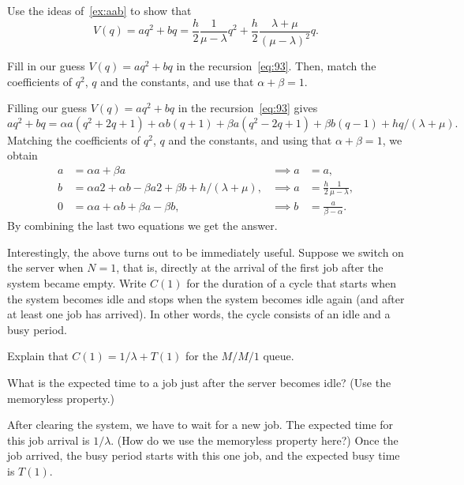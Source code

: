 \begin{exercise}\label{ex:nmm-2}
  Use the ideas of~\cref{ex:aab} to show that
  \begin{equation*}
    V(q) = a q^2 + b q = \frac h 2 \frac 1 {\mu -\lambda} q^2 + \frac h 2 \frac{\lambda + \mu}{(\mu - \lambda)^2}q.
  \end{equation*}

\begin{hint}
  Fill in our guess $V(q) = aq^2 + bq$ in the recursion~\cref{eq:93}.
  Then, match the coefficients of $q^2$, $q$ and the constants, and use that $\alpha + \beta = 1$.
\end{hint}

\begin{solution}
 Filling our guess $V(q) = aq^2 + bq$ in the recursion~\cref{eq:93}  gives
  \begin{equation*}
    aq^2 + b q = \alpha a (q^2 + 2q + 1) + \alpha b (q+1) + \beta a (q^2 - 2q + 1) + \beta b (q - 1) + hq/(\lambda + \mu). 
  \end{equation*}
  Matching the coefficients of $q^2$, $q$ and the constants, and using that $\alpha + \beta = 1$, we obtain
  \begin{align*}
    a &= \alpha a + \beta a &\implies a &= a, \\
    b &= \alpha a 2 + \alpha b - \beta a 2 + \beta b + h/(\lambda + \mu), & \implies a &= \frac h 2 \frac 1 {\mu -\lambda},\\
    0 &= \alpha a + \alpha b + \beta a - \beta b, & \implies b &= \frac a {\beta - \alpha}. 
  \end{align*}
By combining the last two equations we get the answer. 
\end{solution}
\end{exercise}


Interestingly, the above turns out to be immediately useful.
Suppose we switch on the server when $N=1$, that is, directly at the arrival of the first job after the system became empty.
Write $C(1)$ for the duration of a cycle that starts when the system becomes idle and stops when the system becomes idle again (and after at least one job has arrived).
In other words, the cycle consists of an idle and a busy period.

\begin{exercise}
Explain that $C(1)=1/\lambda + T(1)$ for the $M/M/1$ queue.
\begin{hint}
  What is the expected  time to a job just after the server becomes idle? (Use the memoryless property.)
\end{hint}
\begin{solution}
  After clearing the system, we have to wait for a new job.
  The expected time for this job arrival is $1/\lambda$.
  (How do we use the memoryless property here?)
  Once the job arrived, the busy period starts with this one job, and the expected busy time is $T(1)$.
\end{solution}
\end{exercise}

